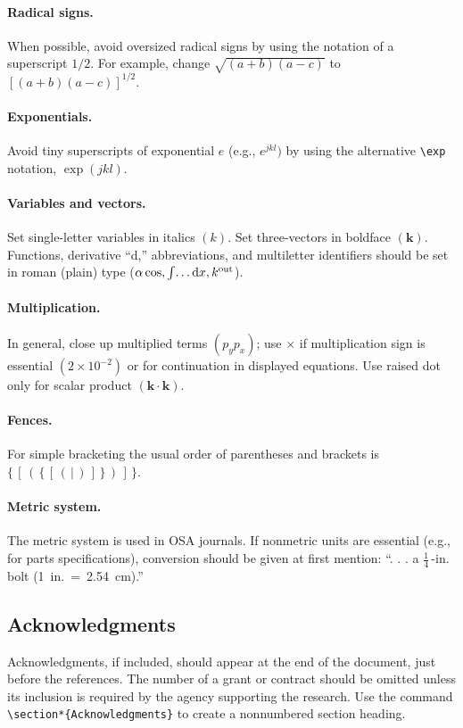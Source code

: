 \documentclass[10pt,letterpaper]{article}
\begin{document}
\paragraph*{\bf Radical signs.}
When possible, avoid oversized radical signs
by using the notation of a superscript $1/2$. For example, change
$\sqrt{(a + b)(a - c)}$ to $[(a + b)(a - c)]^{1/2}$.

\paragraph*{\bf Exponentials.} Avoid tiny superscripts of exponential $e$ (e.g.,
$e^{jkl})$ by using the alternative \verb+\exp+ notation,
$\exp(jkl)$.

\paragraph*{\bf Variables and vectors.}
Set single-letter variables in italics $(k)$. Set three-vectors in
boldface $(\mathbf{k})$. Functions, derivative ``d,''
abbreviations, and multiletter identifiers should be set in roman
(plain) type  ($\alpha \cos, \int\!\dots{\rm d}x, k^{\rm out}$).

\paragraph*{\bf Multiplication.}
In general, close up multiplied terms $(p_yp_x)$;
use $\times$ if multiplication sign is essential $(2 \times
10^{-2})$ or for continuation in displayed equations. Use raised dot only for scalar product $(\mathbf{k \cdot k})$.

\paragraph*{\bf Fences.}
For simple bracketing the usual order of parentheses and brackets
is $\{ \, [  \, (  \,  \{  \, [  \, (  \, |  \, )  \, ]  \, \} \,
)  \, ]  \, \}$.


\paragraph*{\bf Metric system.}
The metric system is used in OSA journals. If nonmetric units are
essential (e.g., for parts specifications), conversion should be
given at first mention:  ``. . . a $\frac{1}{4}$\,-in. bolt \mbox{(1 in.
= 2.54 cm).''}

\subsection{Acknowledgments} Acknowledgments, if included, should
appear at the end of the document, just before the references. The
number of a grant or contract should be omitted unless its
inclusion is required by the agency supporting the research. Use
the command \verb+\section*{Acknowledgments}+  to create a
nonnumbered section heading.
\end{document}
